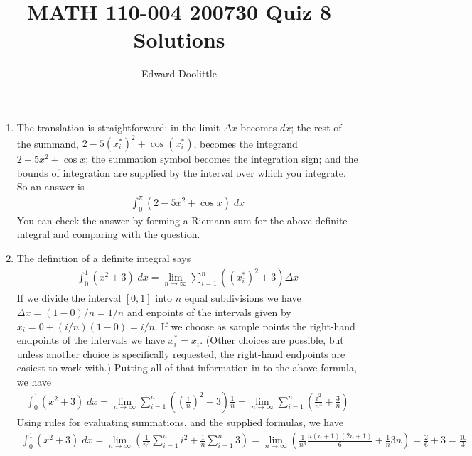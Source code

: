 \documentclass[12pt]{article}
\title{MATH 110-004 200730 Quiz 8 Solutions}
\author{Edward Doolittle}
\begin{document}
\maketitle

\begin{enumerate}
\item The translation is straightforward: in the limit $\Delta x$ becomes $dx$;
  the rest of the summand, $2-5(x_i^*)^2+\cos(x_i^*)$,
  becomes the integrand $2-5x^2+\cos x$; the summation symbol becomes the
  integration sign; and the bounds of integration are supplied by the interval
  over which you integrate.  So an answer is
  \begin{align*}
    \int_0^\pi (2-5x^2+\cos x) \; dx
  \end{align*}
  You can check the answer by forming a Riemann sum for the above definite
  integral and comparing with the question.
\item The definition of a definite integral says
  \begin{align*}
    \int_0^1 (x^2+3) \; dx
    = \lim_{n\to\infty} \sum_{i=1}^n \left( (x_i^*)^2 + 3 \right) \Delta x
  \end{align*}
  If we divide the interval $[0,1]$ into $n$ equal subdivisions we have
  $\Delta x=(1-0)/n=1/n$ and enpoints of the intervals given by
  $x_i=0+(i/n)(1-0) = i/n$.  If we choose as sample points the right-hand
  endpoints of the intervals we have $x_i^* = x_i$.  (Other choices are
  possible, but unless another choice is specifically requested, the 
  right-hand endpoints are easiest to work with.)  Putting all of that 
  information in to the above formula, we have
  \begin{align*}
    \int_0^1 (x^2+3) \; dx
    = \lim_{n\to\infty}\sum_{i=1}^n\left(\left(\frac{i}{n}\right)^2+3\right)
    \frac{1}{n}
    = \lim_{n\to\infty}\sum_{i=1}^n \left(\frac{i^2}{n^3} + \frac{3}{n}\right)
  \end{align*}
  Using rules for evaluating summations, and the supplied formulas, we have
  \begin{align*}
    \int_0^1 (x^2+3) \; dx
    = \lim_{n\to\infty} \left( \frac{1}{n^3} \sum_{i=1}^n i^2
    + \frac{1}{n} \sum_{i=1}^n 3 \right)
    = \lim_{n\to\infty} \left( \frac{1}{n^3} \frac{n(n+1)(2n+1)}{6}
    + \frac{1}{n} 3n \right)
    = \frac{2}{6} + 3 = \frac{10}{3}
  \end{align*}
\end{enumerate}
\end{document}
